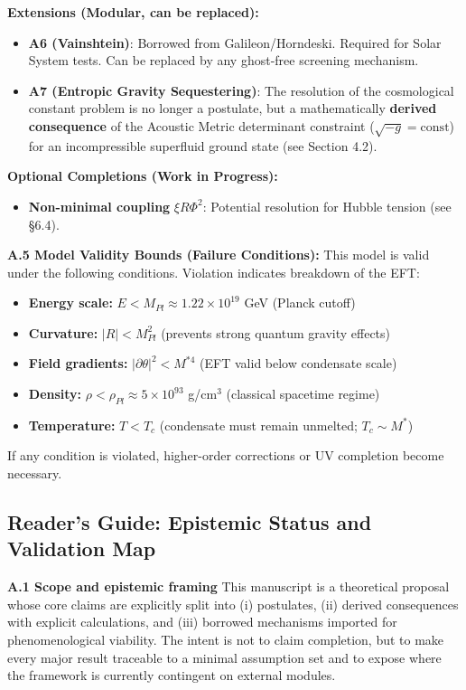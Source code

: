 \documentclass[a4paper,12pt]{article}
\begin{document}
\textbf{Extensions (Modular, can be replaced):}
\begin{itemize}
\item \textbf{A6 (Vainshtein)}: Borrowed from Galileon/Horndeski. Required for Solar System tests. Can be replaced by any ghost-free screening mechanism.
\item \textbf{A7 (Entropic Gravity Sequestering)}: The resolution of the cosmological constant problem is no longer a postulate, but a mathematically \textbf{derived consequence} of the Acoustic Metric determinant constraint ($\sqrt{-g} = \text{const}$) for an incompressible superfluid ground state (see Section 4.2).
\end{itemize}

\textbf{Optional Completions (Work in Progress):}
\begin{itemize}
\item \textbf{Non-minimal coupling} $\xi R\Phi^2$: Potential resolution for Hubble tension (see §6.4).
\end{itemize}

\textbf{A.5 Model Validity Bounds (Failure Conditions):}
This model is valid under the following conditions. Violation indicates breakdown of the EFT:
\begin{itemize}
    \item \textbf{Energy scale:} $E < M_{Pl} \approx 1.22 \times 10^{19}$ GeV (Planck cutoff)
    \item \textbf{Curvature:} $|R| < M_{Pl}^2$ (prevents strong quantum gravity effects)
    \item \textbf{Field gradients:} $|\partial\theta|^2 < M^{*4}$ (EFT valid below condensate scale)
    \item \textbf{Density:} $\rho < \rho_{Pl} \approx 5 \times 10^{93}$ g/cm$^3$ (classical spacetime regime)
    \item \textbf{Temperature:} $T < T_c$ (condensate must remain unmelted; $T_c \sim M^*$)
\end{itemize}
If any condition is violated, higher-order corrections or UV completion become necessary.

\subsection{Reader's Guide: Epistemic Status and Validation Map}

\textbf{A.1 Scope and epistemic framing}
This manuscript is a theoretical proposal whose core claims are explicitly split into (i) postulates, (ii) derived consequences with explicit calculations, and (iii) borrowed mechanisms imported for phenomenological viability. The intent is not to claim completion, but to make every major result traceable to a minimal assumption set and to expose where the framework is currently contingent on external modules.
\end{document}
